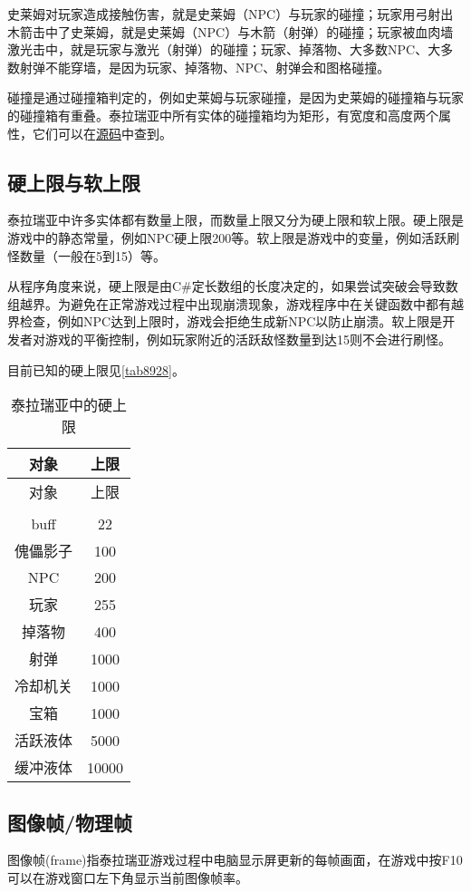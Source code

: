 史莱姆对玩家造成接触伤害，就是史莱姆（NPC）与玩家的碰撞；玩家用弓射出木箭击中了史莱姆，就是史莱姆（NPC）与木箭（射弹）的碰撞；玩家被血肉墙激光击中，就是玩家与激光（射弹）的碰撞；玩家、掉落物、大多数NPC、大多数射弹不能穿墙，是因为玩家、掉落物、NPC、射弹会和图格碰撞。

碰撞是通过碰撞箱判定的，例如史莱姆与玩家碰撞，是因为史莱姆的碰撞箱与玩家的碰撞箱有重叠。泰拉瑞亚中所有实体的碰撞箱均为矩形，有宽度和高度两个属性，它们可以在\hyperref[app8]{源码}中查到。

\subsection{硬上限与软上限}
泰拉瑞亚中许多实体都有数量上限，而数量上限又分为硬上限和软上限。硬上限是游戏中的静态常量，例如NPC硬上限200等。软上限是游戏中的变量，例如活跃刷怪数量（一般在5到15）等。

从程序角度来说，硬上限是由C\#定长数组的长度决定的，如果尝试突破会导致数组越界。为避免在正常游戏过程中出现崩溃现象，游戏程序中在关键函数中都有越界检查，例如NPC达到上限时，游戏会拒绝生成新NPC以防止崩溃。软上限是开发者对游戏的平衡控制，例如玩家附近的活跃敌怪数量到达15则不会进行刷怪。

目前已知的硬上限见\autoref{tab8928}。
\begin{longtable}{|c|c|}
\caption{泰拉瑞亚中的硬上限}\label{tab8928}\\\hline
对象&上限\\\hline
\endfirsthead
\hline 对象&上限\\\hline
\endhead
\\\hline
\endfoot
buff&22\\\hline
傀儡影子&100\\\hline
NPC&200\\\hline
玩家&255\\\hline
掉落物&400\\\hline
射弹&1000\\\hline
冷却机关&1000\\\hline
宝箱&1000\\\hline
活跃液体&5000\\\hline
缓冲液体&10000
\end{longtable}

\subsection{图像帧/物理帧}

图像帧(frame)指泰拉瑞亚游戏过程中电脑显示屏更新的每帧画面，在游戏中按F10可以在游戏窗口左下角显示当前图像帧率。

